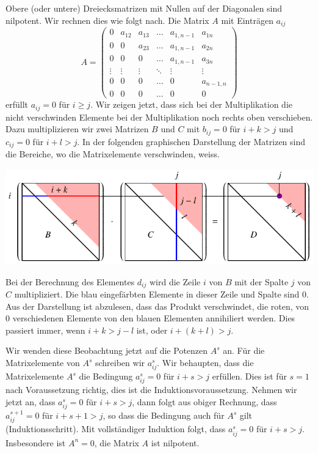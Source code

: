 \begin{beispiel}
Obere (oder untere) Dreiecksmatrizen mit Nullen auf der Diagonalen
sind nilpotent.
Wir rechnen dies wie folgt nach.
Die Matrix $A$ mit Einträgen $a_{ij}$
\[
A=\begin{pmatrix}
  0   &a_{12}&a_{13}&\dots &a_{1,n-1}&a_{1n}   \\
  0   &  0   &a_{23}&\dots &a_{1,n-1}&a_{2n}   \\
  0   &  0   &  0   &\dots &a_{1,n-1}&a_{3n}   \\
\vdots&\vdots&\vdots&\ddots&\vdots   &\vdots   \\
  0   &  0   &  0   &\dots &  0      &a_{n-1,n}\\
  0   &  0   &  0   &\dots &  0      &  0
\end{pmatrix}
\]
erfüllt $a_{ij}=0$ für $i\ge j$.
Wir zeigen jetzt, dass sich bei der Multiplikation die nicht
verschwinden Elemente bei der Multiplikation noch rechts oben
verschieben.
Dazu multiplizieren wir zwei Matrizen $B$ und $C$ mit
$b_{ij}=0$ für $i+k>j$ und $c_{ij}=0$ für $i+l>j$.
In der folgenden graphischen Darstellung der Matrizen sind die
Bereiche, wo die Matrixelemente verschwinden, weiss.
\begin{center}
\includegraphics{chapters/40-eigenwerte/images/nilpotent.pdf}
\end{center}
Bei der Berechnung des Elementes $d_{ij}$ wird die Zeile $i$ von $B$
mit der Spalte $j$ von $C$ multipliziert.
Die blau eingefärbten Elemente in dieser Zeile und Spalte sind $0$.
Aus der Darstellung ist abzulesen, dass das Produkt verschwindet, 
die roten, von $0$ verschiedenen Elemente von den blauen Elementen
annihiliert werden.
Dies passiert immer, wenn $i+k>j-l$ ist, oder $i+(k+l)> j$.

Wir wenden diese Beobachtung jetzt auf die Potenzen $A^s$ an.
Für die Matrixelemente von $A^s$ schreiben wir $a^s_{ij}$.
Wir behaupten, dass die Matrixelemente $A^s$ die Bedingung
$a_{ij}^s=0$ für $i+s>j$ erfüllen.
Dies ist für $s=1$ nach Voraussetzung richtig, dies ist die
Induktionsvoraussetzung.
Nehmen wir jetzt an, dass $a_{ij}^s=0$ für $i+s>j$, dann folgt
aus obiger Rechnung, dass $a_{ij}^{s+1}=0$ für $i+s+1>j$, so
dass die Bedingung auch für $A^s$ gilt (Induktionsschritt).
Mit vollständiger Induktion folgt, dass $a_{ij}^s=0$ für $i+s>j$.
Insbesondere ist $A^n=0$, die Matrix $A$ ist nilpotent.
\end{beispiel}



